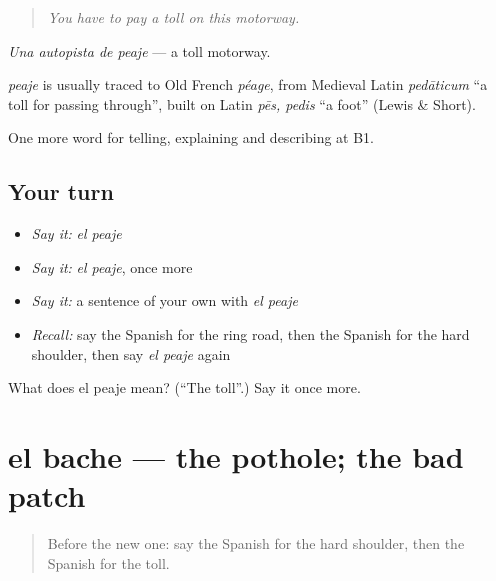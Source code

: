 \begin{quote}
\emph{You have to pay a toll on this motorway.}
\end{quote}

\emph{Una autopista de peaje} — a toll motorway.

\begin{cousinweb}
\emph{peaje} is usually traced to Old French \emph{péage}, from Medieval Latin \emph{pedāticum} \textquotedblleft{}a toll for passing through\textquotedblright{}, built on Latin \emph{pēs, pedis} \textquotedblleft{}a foot\textquotedblright{} (Lewis \& Short).
\end{cousinweb}

\begin{grammarlens}[title={What you've built}]
One more word for telling, explaining and describing at B1.
\end{grammarlens}

\subsection*{Your turn}
\begin{itemize}
\raggedright
  \item \emph{Say it:} \emph{el peaje}
  \item \emph{Say it:} \emph{el peaje}, once more
  \item \emph{Say it:} a sentence of your own with \emph{el peaje}
  \item \emph{Recall:} say the Spanish for the ring road, then the Spanish for the hard shoulder, then say \emph{el peaje} again
\end{itemize}

\begin{tcolorbox}[breakable,colback=teal!4,colframe=teal!35!black,title={Before you move on}]
What does el peaje mean? (\textquotedblleft{}The toll\textquotedblright{}.) Say it once more.
\end{tcolorbox}
\section[el bache]{el bache — the pothole; the bad patch}

\label{lesson:ES-C642-bache}



\begin{quote}
Before the new one: say the Spanish for the hard shoulder, then the Spanish for the toll.
\end{quote}

